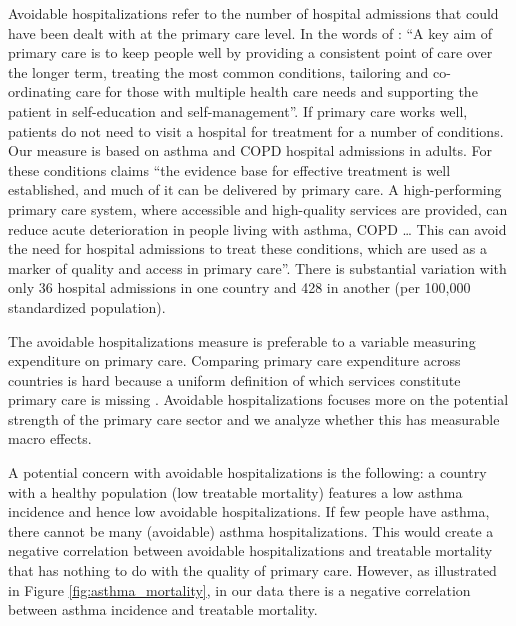 \documentclass[a4paper,12pt]{article}
\begin{document}
Avoidable hospitalizations refer to the number of hospital admissions that could have been dealt with at the primary care level. In the words of  \cite{OECD_avoidable_hospitalizations}: ``A key aim of primary care is to keep people well by providing a consistent point of care over the longer term, treating the most common conditions, tailoring and co-ordinating care for those with multiple health care needs and supporting the patient in self-education and self-management''. If primary care works well, patients do not need to visit a hospital for treatment for a number of conditions. Our measure is based on asthma and COPD hospital admissions in adults. For these conditions \cite{OECD_2019_glance} claims ``the evidence base for effective treatment is well established, and much of it can be delivered by primary care. A high-performing primary care system, where accessible and high-quality services are provided, can reduce acute deterioration in people living with asthma, COPD \ldots{} This can avoid the need for hospital admissions to treat these conditions, which are used as a marker of quality and access in primary care''. There is substantial variation with only 36 hospital admissions in one country and 428 in another (per 100,000 standardized population).

The avoidable hospitalizations measure is preferable to a variable measuring expenditure on primary care. Comparing primary care expenditure across countries is hard because a uniform definition of which services constitute primary care is missing \citep{OECD_2020}. Avoidable hospitalizations focuses more on the potential strength of the primary care sector and we analyze whether this has measurable macro effects.

A potential concern with avoidable hospitalizations is the following: a country with a healthy population (low treatable mortality) features a low asthma incidence and hence low avoidable hospitalizations. If few people have asthma, there cannot be many (avoidable) asthma hospitalizations. This would create a negative correlation between avoidable hospitalizations and treatable mortality that has nothing to do with the quality of primary care. However, as illustrated in Figure \ref{fig:asthma_mortality}, in our data there is a negative correlation between asthma incidence and treatable mortality.
\end{document}
